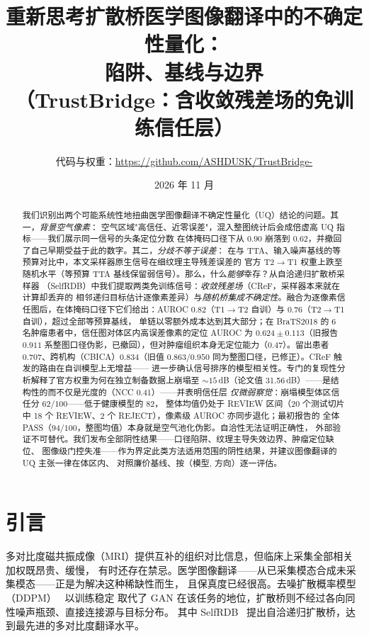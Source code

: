 \documentclass[11pt]{article}
\title{重新思考扩散桥医学图像翻译中的不确定性量化：\\陷阱、基线与边界\\
\large （TrustBridge：含收敛残差场的免训练信任层）}
\author{%
  \small 代码与权重：\url{https://github.com/ASHDUSK/TrustBridge-}
}
\date{2026 年 11 月}
\newcommand{\TrustMap}{信任图}
\begin{document}
\maketitle

\begin{abstract}
我们识别出两个可能系统性地扭曲医学图像翻译不确定性量化（UQ）结论的问题。其一，\emph{背景空气像素}：
空气区域"高信任、近零误差"，混入整图统计后会成倍虚高 UQ 指标——我们展示同一信号的头条定位分数
在体掩码口径下从 $0.90$ 崩落到 $0.62$，并撤回了自己早期受益于此的数字。其二，\emph{分歧不等于误差}：
在与 TTA、输入噪声基线的等预算对比中，本文采样器原生信号在细纹理主导残差误差的
官方 T2$\to$T1 权重上跌至随机水平（等预算 TTA 基线保留弱信号）。那么，什么\emph{能够}幸存？从自洽递归扩散桥采样器
（SelfRDB）中我们提取两类免训练信号：\emph{收敛残差场}（CReF，采样器本来就在计算却丢弃的
相邻递归目标估计逐像素差异）与\emph{随机桥集成不确定性}。融合为逐像素\TrustMap{}后，在体掩码口径下它们给出：AUROC $0.82$（T1$\to$T2 自训）与 $0.76$（T2$\to$T1 自训），超过全部等预算基线，
单链以零额外成本达到其大部分；在 BraTS2018 的 6 名肿瘤患者中，信任图对体区内高误差像素的定位 AUROC 为 $0.624\pm0.113$（旧报告 $0.911$ 系整图口径伪影，已撤回），但对肿瘤组织本身无定位能力（$0.47$）。留出患者 $0.707$、跨机构（CBICA）$0.834$（旧值 $0.863$/$0.950$ 同为整图口径，已修正）。CReF 触发的路由在自训模型上无增益——
进一步确认信号排序的模型相关性。专门的复现性分析解释了官方权重为何在独立制备数据上崩塌至
${\sim}15$\,dB（论文值 31.56\,dB）——是结构性的而不仅是光度的（NCC 0.41）——并表明信任层
\emph{仅微弱察觉}：崩塌模型体区信任分 $62/100$——低于健康模型的 $82$，
整体均值仍处于 REVIEW 区间（20 个测试切片中 18 个 REVIEW、2 个 REJECT），像素级 AUROC 亦同步退化；最初报告的
全体 PASS（$94/100$，整图均值）本身就是空气池化伪影。自洽性无法证明正确性，
外部验证不可替代。我们发布全部阴性结果——口径陷阱、纹理主导失效边界、肿瘤定位缺位、
图像级门控失准——作为界定此类方法适用范围的阴性结果，并建议图像翻译的 UQ 主张一律在体区内、
对照廉价基线、按（模型, 方向）逐一评估。
\end{abstract}

\section{引言}
\label{sec:intro}
多对比度磁共振成像（MRI）提供互补的组织对比信息，但临床上采集全部相关加权既昂贵、缓慢，
有时还存在禁忌。医学图像翻译——从已采集模态合成未采集模态——正是为解决这种稀缺性而生，
且保真度已经很高。去噪扩散概率模型（DDPM）~\cite{ho2020ddpm,nichol2021iddpm} 以训练稳定
取代了 GAN 在该任务的地位，扩散桥则不经过各向同性噪声瓶颈、直接连接源与目标分布。
其中 SelfRDB~\cite{arslan2025selfrdb} 提出自洽递归扩散桥，达到最先进的多对比度翻译水平。
\end{document}
